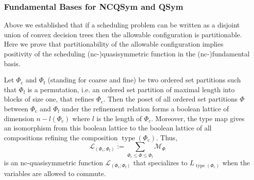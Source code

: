 \documentclass[12pt,reqno]{amsart}
\numberwithin{definition}{section}
\theoremstyle{definition}
\newcommand{\SSS}{\mathcal{S}}
\newcommand{\ncM}{\mathcal{M}}
\newcommand{\ncL}{\mathcal{L}}
\newcommand{\poly}{\chi} %
\begin{document}
\subsubsection{Fundamental Bases for NCQSym and QSym}



Above we established that if a scheduling problem can be written as a
disjoint union of  convex decision trees then the allowable
configuration is partitionable.  Here we prove that partitionability
of the allowable configuration implies positivity of the scheduling
(nc-)quasisymmetric function in the (nc-)fundamental basis.



 Let $\Phi_\text{c}$ and $\Phi_\text{f}$ (standing for coarse and fine) be two ordered set partitions such that $\Phi_\text{f}$ is a permutation, i.e. an ordered set partition of maximal length into blocks of size one, that refines $\Phi_\text{c}$. Then the poset of all ordered set partitions $\Phi$  between $\Phi_\text{c}$ and $\Phi_\text{f}$ under the refinement relation forms a boolean lattice of dimension $n-l(\Phi_\text{c})$ where $l$ is the length of $\Phi_\text{c}$. Moreover, the type map gives an isomorphism from this boolean lattice to the boolean lattice of all compositions refining the composition $\operatorname{type}(\Phi_\text{c})$. Thus,
\[
  \ncL_{(\Phi_\text{c};\Phi_\text{f})} := \sum_{\Phi_\text{c}\leq \Phi \leq \Phi_\text{f}} \ncM_\Phi
\]
is an nc-quasisymmetric function $\ncL_{(\Phi_\text{c};\Phi_\text{f})}$ that specializes to $L_{\operatorname{type}(\Phi_\text{c})}$ when the variables are allowed to commute.
\end{document}
